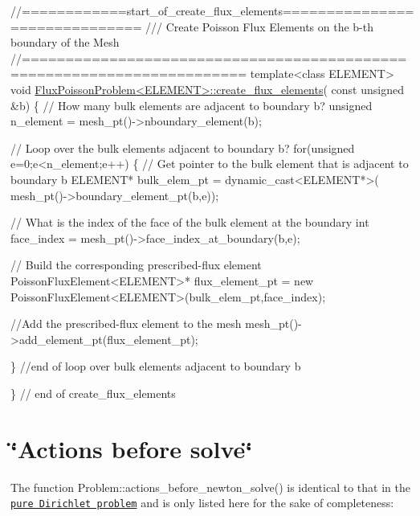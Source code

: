 \begin{DoxyCodeInclude}
\textcolor{comment}{//============start\_of\_create\_flux\_elements==============================}
\textcolor{comment}{/// Create Poisson Flux Elements on the b-th boundary of the Mesh}
\textcolor{comment}{}\textcolor{comment}{//=======================================================================}
\textcolor{keyword}{template}<\textcolor{keyword}{class} ELEMENT>
\textcolor{keywordtype}{void} \hyperlink{classFluxPoissonProblem_a542ce9cc1c4e17eae68d51d2e13ac0c3}{FluxPoissonProblem<ELEMENT>::create\_flux\_elements}(\textcolor{keyword}{
      const} \textcolor{keywordtype}{unsigned} &b)
\{
 \textcolor{comment}{// How many bulk elements are adjacent to boundary b?}
 \textcolor{keywordtype}{unsigned} n\_element = mesh\_pt()->nboundary\_element(b);

 \textcolor{comment}{// Loop over the bulk elements adjacent to boundary b?}
 \textcolor{keywordflow}{for}(\textcolor{keywordtype}{unsigned} e=0;e<n\_element;e++)
  \{
   \textcolor{comment}{// Get pointer to the bulk element that is adjacent to boundary b}
   ELEMENT* bulk\_elem\_pt = \textcolor{keyword}{dynamic\_cast<}ELEMENT*\textcolor{keyword}{>}(
    mesh\_pt()->boundary\_element\_pt(b,e));
   
   \textcolor{comment}{// What is the index of the face of the bulk element at the boundary}
   \textcolor{keywordtype}{int} face\_index = mesh\_pt()->face\_index\_at\_boundary(b,e);

   \textcolor{comment}{// Build the corresponding prescribed-flux element}
   PoissonFluxElement<ELEMENT>* flux\_element\_pt = \textcolor{keyword}{new} 
   PoissonFluxElement<ELEMENT>(bulk\_elem\_pt,face\_index);

   \textcolor{comment}{//Add the prescribed-flux element to the mesh}
   mesh\_pt()->add\_element\_pt(flux\_element\_pt);

  \} \textcolor{comment}{//end of loop over bulk elements adjacent to boundary b}

\} \textcolor{comment}{// end of create\_flux\_elements}

\end{DoxyCodeInclude}




 

\hypertarget{index_actions_before}{}\section{\char`\"{}\+Actions before solve\char`\"{}}\label{index_actions_before}
The function {\ttfamily Problem\+::actions\+\_\+before\+\_\+newton\+\_\+solve()} is identical to that in the \href{../../../poisson/two_d_poisson/html/index.html}{\tt pure Dirichlet problem} and is only listed here for the sake of completeness\+:


